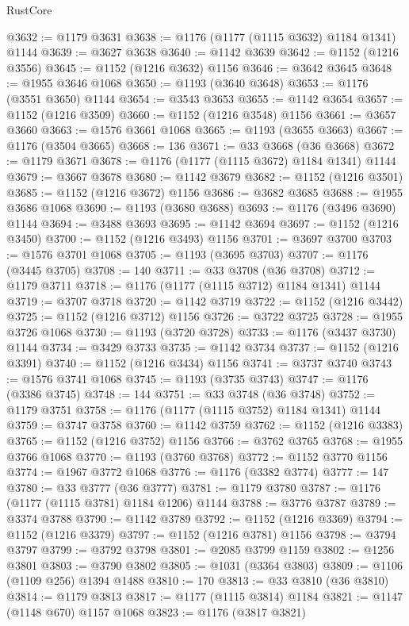 \begin{lexlean}{RustCore}
\begin{coremodule}
@3632 := @1179 @3631
@3638 := @1176 (@1177 (@1115 @3632) @1184 @1341) @1144
@3639 := @3627 @3638
@3640 := @1142 @3639
@3642 := @1152 (@1216 @3556)
@3645 := @1152 (@1216 @3632) @1156
@3646 := @3642 @3645
@3648 := @1955 @3646 @1068
@3650 := @1193 (@3640 @3648)
@3653 := @1176 (@3551 @3650) @1144
@3654 := @3543 @3653
@3655 := @1142 @3654
@3657 := @1152 (@1216 @3509)
@3660 := @1152 (@1216 @3548) @1156
@3661 := @3657 @3660
@3663 := @1576 @3661 @1068
@3665 := @1193 (@3655 @3663)
@3667 := @1176 (@3504 @3665)
@3668 := 136
@3671 := @33 @3668 (@36 @3668)
@3672 := @1179 @3671
@3678 := @1176 (@1177 (@1115 @3672) @1184 @1341) @1144
@3679 := @3667 @3678
@3680 := @1142 @3679
@3682 := @1152 (@1216 @3501)
@3685 := @1152 (@1216 @3672) @1156
@3686 := @3682 @3685
@3688 := @1955 @3686 @1068
@3690 := @1193 (@3680 @3688)
@3693 := @1176 (@3496 @3690) @1144
@3694 := @3488 @3693
@3695 := @1142 @3694
@3697 := @1152 (@1216 @3450)
@3700 := @1152 (@1216 @3493) @1156
@3701 := @3697 @3700
@3703 := @1576 @3701 @1068
@3705 := @1193 (@3695 @3703)
@3707 := @1176 (@3445 @3705)
@3708 := 140
@3711 := @33 @3708 (@36 @3708)
@3712 := @1179 @3711
@3718 := @1176 (@1177 (@1115 @3712) @1184 @1341) @1144
@3719 := @3707 @3718
@3720 := @1142 @3719
@3722 := @1152 (@1216 @3442)
@3725 := @1152 (@1216 @3712) @1156
@3726 := @3722 @3725
@3728 := @1955 @3726 @1068
@3730 := @1193 (@3720 @3728)
@3733 := @1176 (@3437 @3730) @1144
@3734 := @3429 @3733
@3735 := @1142 @3734
@3737 := @1152 (@1216 @3391)
@3740 := @1152 (@1216 @3434) @1156
@3741 := @3737 @3740
@3743 := @1576 @3741 @1068
@3745 := @1193 (@3735 @3743)
@3747 := @1176 (@3386 @3745)
@3748 := 144
@3751 := @33 @3748 (@36 @3748)
@3752 := @1179 @3751
@3758 := @1176 (@1177 (@1115 @3752) @1184 @1341) @1144
@3759 := @3747 @3758
@3760 := @1142 @3759
@3762 := @1152 (@1216 @3383)
@3765 := @1152 (@1216 @3752) @1156
@3766 := @3762 @3765
@3768 := @1955 @3766 @1068
@3770 := @1193 (@3760 @3768)
@3772 := @1152 @3770 @1156
@3774 := @1967 @3772 @1068
@3776 := @1176 (@3382 @3774)
@3777 := 147
@3780 := @33 @3777 (@36 @3777)
@3781 := @1179 @3780
@3787 := @1176 (@1177 (@1115 @3781) @1184 @1206) @1144
@3788 := @3776 @3787
@3789 := @3374 @3788
@3790 := @1142 @3789
@3792 := @1152 (@1216 @3369)
@3794 := @1152 (@1216 @3379)
@3797 := @1152 (@1216 @3781) @1156
@3798 := @3794 @3797
@3799 := @3792 @3798
@3801 := @2085 @3799 @1159
@3802 := @1256 @3801
@3803 := @3790 @3802
@3805 := @1031 (@3364 @3803)
@3809 := @1106 (@1109 @256) @1394 @1488
@3810 := 170
@3813 := @33 @3810 (@36 @3810)
@3814 := @1179 @3813
@3817 := @1177 (@1115 @3814) @1184
@3821 := @1147 (@1148 @670) @1157 @1068
@3823 := @1176 (@3817 @3821)

\end{coremodule}
\end{lexlean}
